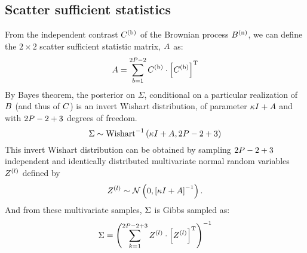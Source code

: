 \subsection{Scatter sufficient statistics}
From the independent contrast $C^{(\text{b})}$ of the Brownian process $B^{(\text{n})}$, we can define the $2 \times 2$ scatter sufficient statistic matrix, $A$ as:
\begin{equation}
    A = \sum\limits_{b=1}^{2 P - 2} C^{(\text{b})} \cdot \left[C^{(\text{b})}\right]^{\mathrm{T}}
\end{equation}
By Bayes theorem, the posterior  on $\Sigma$, conditional on a particular realization of $B$ (and thus of $C$) is an invert Wishart distribution, of parameter $\kappa I + A$ and with $2 P - 2 + 3$ degrees of freedom.
\begin{equation}
    \Sigma \sim \mathrm{Wishart}^{-1}\left( \kappa I + A, 2 P - 2 + 3\right)
\end{equation}
This invert Wishart distribution can be obtained by sampling $2 P - 2 + 3$ independent and identically distributed multivariate normal random variables $Z^{(l)}$ defined by
\begin{equation}
    Z^{(l)} \sim \mathcal{N} \left( 0, \left[\kappa I + A\right]^{-1} \right).
\end{equation}
And from these multivariate samples, $\Sigma$ is Gibbs sampled as:
\begin{equation}
    \Sigma = \left( \sum\limits_{k=1}^{2 P - 2 + 3} Z^{(l)} \cdot \left[Z^{(l)} \right] ^{\mathrm{T}} \right)^{-1}
\end{equation}

